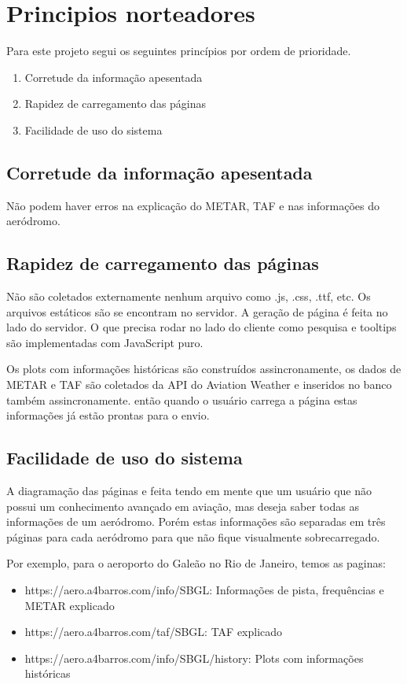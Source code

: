 \chapter{Principios norteadores}

Para este projeto segui os seguintes princípios por ordem de prioridade.

\begin {enumerate}
\item Corretude da informação apesentada
\item Rapidez de carregamento das páginas
\item Facilidade de uso do sistema
\end {enumerate}

\section{Corretude da informação apesentada}
Não podem haver erros na explicação do METAR, TAF e nas informações do aeródromo.

\section{Rapidez de carregamento das páginas}
Não são coletados externamente nenhum
arquivo como .js, .css, .ttf, etc. Os arquivos estáticos são se encontram no servidor.
A geração de página é feita no lado do servidor. O que
precisa rodar no lado do cliente como pesquisa e tooltips são implementadas com JavaScript puro.

Os plots com informações históricas são construídos assincronamente, os dados de METAR e TAF
são coletados da API do Aviation Weather e inseridos no banco também assincronamente. então
quando o usuário carrega a página estas informações já estão prontas para o envio.

\section{Facilidade de uso do sistema}
A diagramação das páginas e feita tendo em mente que um usuário que não possui um conhecimento
avançado em aviação, mas deseja saber todas as informações de um aeródromo. Porém estas
informações são separadas em três páginas para cada aeródromo para que não fique visualmente
sobrecarregado.

Por exemplo, para o aeroporto do Galeão no Rio de Janeiro, temos as paginas:

\begin{itemize}
\item https://aero.a4barros.com/info/SBGL: Informações de pista, frequências e METAR explicado
\item https://aero.a4barros.com/taf/SBGL: TAF explicado
\item https://aero.a4barros.com/info/SBGL/history: Plots com informações históricas
\end{itemize}

